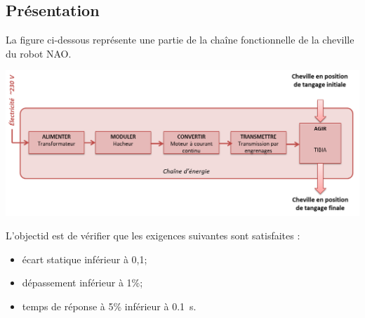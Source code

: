 \documentclass[10pt,fleqn]{article} %
\begin{document}

\vspace{5cm}
\pagestyle{fancy}
\thispagestyle{plain}

\def\columnseprulecolor{\color{ocre}}
\setlength{\columnseprule}{0.4pt} 

\def\pathfig{images}

\begin{multicols}{2}
\section*{Présentation}
La figure ci-dessous représente une partie de la chaîne fonctionnelle de la cheville du robot NAO.
\begin{center}
\includegraphics[width=\linewidth]{images/fig_02}
\end{center}

\begin{obj}
L'objectid est de vérifier que les exigences suivantes sont satisfaites : 
\begin{itemize}
\item écart statique inférieur à 0,1\degres;
\item dépassement inférieur à 1\%;
\item temps de réponse à 5\% inférieur à \SI{0,1}{s}.
\end{itemize}
\end{obj}


\end{multicols}
\end{document}
